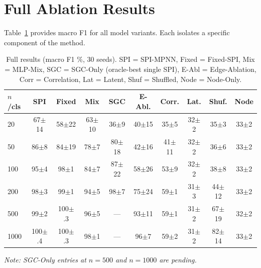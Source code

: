\documentclass{article}
\begin{document}



\newpage
\appendix
\onecolumn

\section{Full Ablation Results}
\label{app:ablation}

Table~\ref{tab:full} provides macro F1 for all model variants. Each isolates a specific component of the method.

\begin{table}[h]
\caption{Full results (macro F1 \%, 30 seeds). SPI = SPI-MPNN, Fixed = Fixed-SPI, Mix = MLP-Mix, SGC = SGC-Only (oracle-best single SPI), E-Abl = Edge-Ablation, Corr = Correlation, Lat = Latent, Shuf = Shuffled, Node = Node-Only.}
\label{tab:full}
\vskip 0.1in
\begin{center}
\begin{small}
\begin{tabular}{lccccccccc}
\toprule
$n$/cls & SPI & Fixed & Mix & SGC & E-Abl. & Corr. & Lat. & Shuf. & Node \\
\midrule
20   & 67{\scriptsize$\pm$14} & 58{\scriptsize$\pm$22} & 63{\scriptsize$\pm$10} & 36{\scriptsize$\pm$9}  & 40{\scriptsize$\pm$15} & 35{\scriptsize$\pm$5}  & 32{\scriptsize$\pm$2} & 35{\scriptsize$\pm$3} & 33{\scriptsize$\pm$2} \\
50   & 86{\scriptsize$\pm$8}  & 84{\scriptsize$\pm$19} & 78{\scriptsize$\pm$7}  & 80{\scriptsize$\pm$18} & 42{\scriptsize$\pm$16} & 41{\scriptsize$\pm$11} & 32{\scriptsize$\pm$2} & 36{\scriptsize$\pm$6} & 33{\scriptsize$\pm$2} \\
100  & 95{\scriptsize$\pm$4}  & 98{\scriptsize$\pm$1}  & 84{\scriptsize$\pm$7}  & 87{\scriptsize$\pm$22} & 58{\scriptsize$\pm$26} & 53{\scriptsize$\pm$9}  & 32{\scriptsize$\pm$2} & 38{\scriptsize$\pm$8} & 33{\scriptsize$\pm$2} \\
200  & 98{\scriptsize$\pm$3}  & 99{\scriptsize$\pm$1}  & 94{\scriptsize$\pm$5}  & 98{\scriptsize$\pm$7}  & 75{\scriptsize$\pm$24} & 59{\scriptsize$\pm$1}  & 31{\scriptsize$\pm$3} & 44{\scriptsize$\pm$12}& 33{\scriptsize$\pm$2} \\
500  & 99{\scriptsize$\pm$2}  & 100{\scriptsize$\pm$.3}& 96{\scriptsize$\pm$5}  & ---  & 93{\scriptsize$\pm$11}& 59{\scriptsize$\pm$1}  & 31{\scriptsize$\pm$2} & 67{\scriptsize$\pm$19}& 32{\scriptsize$\pm$2} \\
1000 & 100{\scriptsize$\pm$.4}& 100{\scriptsize$\pm$.3}& 98{\scriptsize$\pm$1}  & ---  & 96{\scriptsize$\pm$7} & 59{\scriptsize$\pm$2}  & 31{\scriptsize$\pm$2} & 82{\scriptsize$\pm$14}& 33{\scriptsize$\pm$2} \\
\bottomrule
\end{tabular}
\end{small}
\end{center}
\vskip 0.1in
\textit{Note: SGC-Only entries at $n{=}500$ and $n{=}1000$ are pending.}
\end{table}
\end{document}
